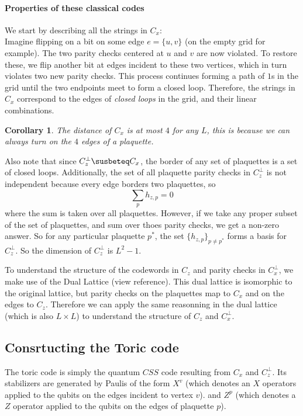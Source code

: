 \documentclass[11pt,a4paper]{article}
\theoremstyle{definition}
\theoremstyle{plain}
\newtheorem{corollary}[definition]{Corollary}
\theoremstyle{remark}
\begin{document}
\paragraph{Properties of these classical codes}
We start by describing all the strings in $C_x$: \\
Imagine flipping on a bit on some edge $e = \{u, v\}$ (on the empty grid for example). The two parity checks centered at $u$ and $v$ are now violated. 
To restore these, we flip another bit at edges incident to these two vertices, which in turn violates two new 
parity checks. This process continues forming a path of $1$s in the grid until the two endpoints meet to form a closed loop. 
Therefore, the strings in $C_x$ correspond to the edges of \emph{closed loops} in the grid, and their linear combinations. 
\begin{corollary}
  The distance of $C_x$ is at most $4$ for any $L$, this is because we can always turn on the $4$ edges of a 
  plaquette. 
\end{corollary}

Also note that since $C_z^\perp \susbeteq C_x$, the border of any set of plaquettes is a set of closed loops. 
Additionally, the set of all plaquette parity checks in $C_z^\perp$ is not independent because every edge borders two 
plaquettes, so 
$$\sum_p h_{z,p} = 0$$
where the sum is taken over all plaquettes. However, if we take any proper subset of the set of plaquettes, and sum over thoes 
parity checks, we get a non-zero answer. So for any particular plaquette $p^*$, the set 
$\{h_{z,p}\}_{p \neq p^*}$ forms a basis for $C_z^\perp$. So the dimension of $C_z^\perp$ is $L^2 - 1$. 

To understand the structure of the codewords in $C_z$ and parity checks in $C_x^\perp$, we make use of the Dual Lattice (view reference). This dual 
lattice is isomorphic to the original lattice, but parity checks on the plaquettes map to $C_x$ and on the edges to $C_z$. Therefore we can apply the same reasonning 
in the dual lattice (which is also $L \times L$) to understand the structure of $C_z$ and $C_x^\perp$. 

\subsection{Consrtucting the Toric code} 
The toric code is simply the quantum $CSS$ code resulting from $C_x$ and $C_z^\perp$. 
Its stabilizers are generated by Paulis of the form $X^v$ (which denotes an $X$ operators applied to the qubits on the edges incident to vertex $v$). 
and $Z^p$ (which denotes a $Z$ operator applied to the qubits on the edges of plaquette $p$). 
\end{document}
